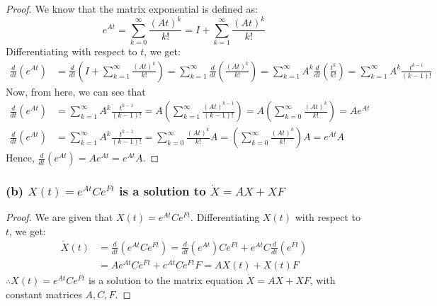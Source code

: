 \begin{proof}
      We know that the matrix exponential is defined as:
      \begin{equation*}
            e^{A t}
            =
            \sum_{k=0}^{\infty} \frac{{(A t)}^{k}}{k !}
            =
            I + \sum_{k=1}^{\infty} \frac{{(A t)}^{k}}{k !}
      \end{equation*}
      Differentiating with respect to \( t \), we get:
      \begin{align*}
            \frac{d}{d t}\left(e^{A t}\right)
             & =
            \frac{d}{d t}\left(I + \sum_{k=1}^{\infty} \frac{{(A t)}^{k}}{k !}\right)
            =
            \sum_{k=1}^{\infty} \frac{d}{d t}\left(\frac{{(A t)}^{k}}{k !}\right)
            =
            \sum_{k=1}^{\infty} A^k \frac{d}{d t}\left(\frac{t^k}{k !}\right)
            =
            \sum_{k=1}^{\infty} A^k \frac{t^{k-1}}{(k-1) !}
      \end{align*}
      Now, from here, we can see that
      \begin{align*}
            \frac{d}{d t}\left(e^{A t}\right)
             & =
            \sum_{k=1}^{\infty} A^k \frac{t^{k-1}}{(k-1) !}
            =
            A \left( \sum_{k=1}^{\infty} \frac{{(A t)}^{k-1}}{(k-1) !} \right)
            =
            A \left( \sum_{k=0}^{\infty} \frac{{(A t)}^{k}}{k !} \right)
            = A e^{A t}
            \\
            \frac{d}{d t}\left(e^{A t}\right)
             & =
            \sum_{k=1}^{\infty} A^k \frac{t^{k-1}}{(k-1) !}
            =
            \sum_{k=0}^{\infty} \frac{{(A t)}^{k}}{k !} A
            =
            \left( \sum_{k=0}^{\infty} \frac{{(A t)}^{k}}{k !} \right) A
            = e^{A t} A
      \end{align*}
      Hence, \( \boxed{ \frac{d}{d t}\left(e^{A t}\right)=A e^{A t}=e^{A t} A } \).
\end{proof}

\clearpage
\subsubsection*{(b) \( X(t)=e^{A t} C e^{F t} \) is a solution to \( \dot{X}=A X+X F \)}

\begin{proof}
      We are given that \( X(t)=e^{A t} C e^{F t} \).
      Differentiating \( X(t) \) with respect to \( t \), we get:
      \begin{align*}
            \dot{X}(t)
             & =
            \frac{d}{d t}\left(e^{A t} C e^{F t}\right)
            =
            \frac{d}{d t}\left(e^{A t}\right) C e^{F t} + e^{A t} C \frac{d}{d t}\left(e^{F t}\right)
            \\ & =
            A e^{A t} C e^{F t} + e^{A t} C e^{F t} F
            =
            A X(t) + X(t) F
      \end{align*}
      \( \therefore \boxed{ X(t) = e^{A t} C e^{F t} } \) is a solution to the matrix equation \( \dot{X}=A X+X F \), with constant matrices \( A, C, F \).
\end{proof}

